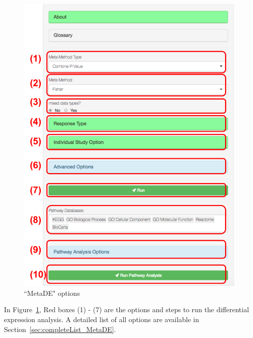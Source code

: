 \begin{figure}[H]
\begin{center}
\includegraphics[scale=0.6]{./figure/metaDE/metaDEoption.pdf}
\caption{``MetaDE" options}
\label{fig:MetaDEoption}
\end{center}
\end{figure}

In Figure~\ref{fig:MetaDEoption},
{\color{red} Red boxes (1) - (7)} are the options and steps to run the differential expression analysis.
A detailed list of all options are available in Section~\ref{sec:completeList_MetaDE}. 

